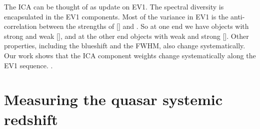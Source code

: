 The \ac{ICA} can be thought of as update on \ac{EV1}. 
The spectral diversity is encapsulated in the \ac{EV1} components. 
Most of the variance in \ac{EV1} is the anti-correlation between the strengths of [] and . 
So at one end we have objects with strong  and weak [], and at the other end objects with weak  and strong []. 
Other properties, including the  blueshift and the \hb FWHM, also change systematically. 
Our work shows that the \ac{ICA} component weights change systematically along the \ac{EV1} sequence. 
. 

\section{Measuring the quasar systemic redshift}

